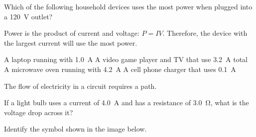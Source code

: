 \documentclass[answers]{exam}
\begin{document}
\begin{questions}

\question
Which of the following household devices uses the most power when plugged into a \SI{120}{V} outlet?

\begin{solution}
Power is the product of current and voltage: $P = IV$. Therefore, the device with the largest current will use the most power.
\end{solution}

\begin{randomizechoices}
    \choice A laptop running with \SI{1.0}{A}
    \choice A video game player and TV that use \SI{3.2}{A} total
    \correctchoice A microwave oven running with \SI{4.2}{A}
    \choice A cell phone charger that uses \SI{0.1}{A}
\end{randomizechoices}

\question
The flow of electricity in a circuit requires a  path.


\question
If a light bulb uses a current of \SI{4.0}{A} and has a resistance of \SI{3.0}{\ohm}, what is the voltage drop across it?

\fillin[\SI{12}{V}]


\question
Identify the symbol shown in the image below. \fillin[battery]

\begin{center}
\end{center}



\end{questions}
\end{document}
